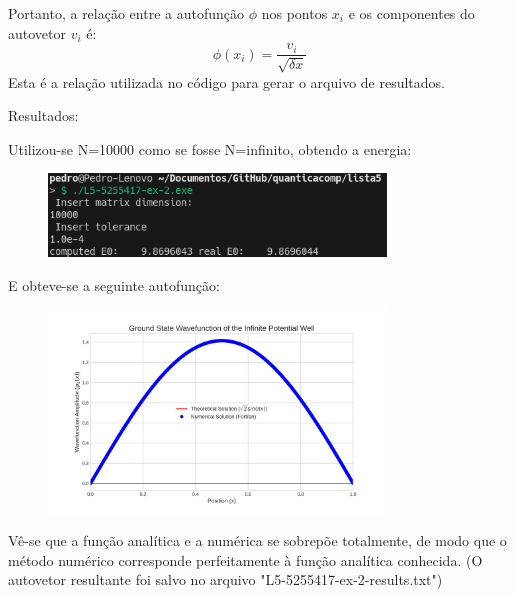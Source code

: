 \documentclass[12pt, a4paper]{article} %
\begin{document}
                Portanto, a relação entre a autofunção $\phi$ nos pontos $x_i$ e os componentes do autovetor $v_i$ é:
                \begin{equation}
                    \phi(x_i) = \frac{v_i}{\sqrt{\delta x}}
                \end{equation}
                Esta é a relação utilizada no código para gerar o arquivo de resultados.

        Resultados:

        Utilizou-se N=10000 como se fosse N=infinito, obtendo a energia:
        \begin{figure}[H]
            \centering
            \includegraphics[width=0.8\textwidth]{../images/ex2.png}
        \end{figure}
        E obteve-se a seguinte autofun\c{c}\~ao:
        \begin{figure}[H]
            \centering
            \includegraphics[width=0.8\textwidth]{../images/wavefunction_plot.png}
        \end{figure}

    V\^e-se que a fun\c{c}\~ao anal\'itica e a num\'erica se sobrep\~oe totalmente, de modo que o m\'etodo num\'erico corresponde perfeitamente à fun\c{c}\~ao anal\'itica conhecida. (O autovetor resultante foi salvo no arquivo "L5-5255417-ex-2-results.txt")
        
\end{document}
